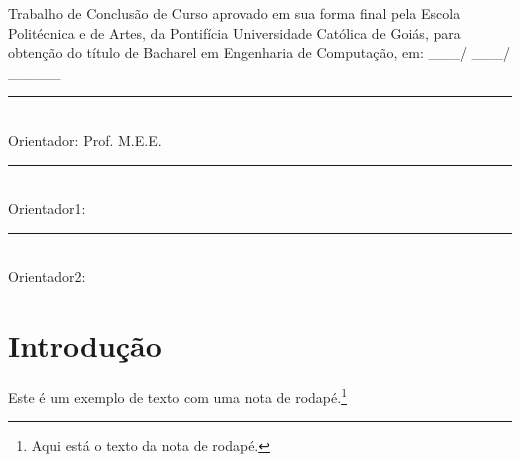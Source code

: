 \documentclass[12pt,a4paper,oneside,brazil]{abntex2}
\begin{document}
\clearpage
    \centering
    \MakeUppercase{\imprimirautor}

    \vfill

    \ABNTEXchapterfont\bfseries\MakeUppercase{\imprimirtitulo}

    \vfill

    \justifying

    \textnormal{Trabalho de Conclusão de Curso aprovado em sua forma final pela Escola Politécnica e de
    Artes, da Pontifícia Universidade Católica de Goiás, para obtenção do título de Bacharel em
    Engenharia de Computação, em: \_\_\_/ \_\_\_/ \_\_\_\_\_}

    \centering

    \vspace*{3cm}

    \begin{flushright}
    \rule{10cm}{0.4pt}\\
    \textnormal{Orientador: Prof. M.E.E. \imprimirorientador}

    \vspace*{10mm}

    \rule{10cm}{0.4pt}\\
    \textnormal{Orientador1:}

    \vspace*{10mm}

    \rule{10cm}{0.4pt}\\
    \textnormal{Orientador2:}
    \end{flushright}

    \vspace*{6cm}

    \bfseries\imprimirlocal

    \bfseries\imprimirdata
\clearpage %


\tableofcontents
\clearpage
\listoffigures   %
\clearpage
\listoftables    %
\clearpage

\setcounter{page}{1}
\textual

\justifying

\chapter{Introdução}
Este é um exemplo de texto com uma nota de rodapé.\footnote{Aqui está o texto da nota de rodapé.} \lipsum[1]
\end{document}

